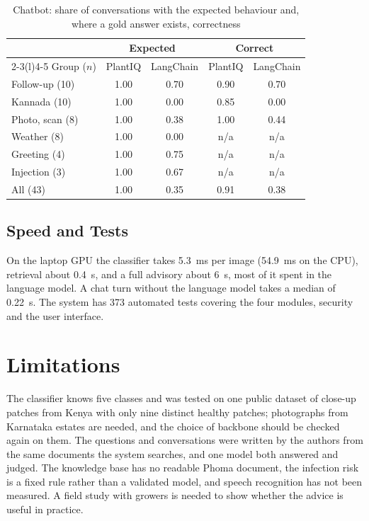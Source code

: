 \begin{table}[t]
\caption{Chatbot: share of conversations with the expected behaviour and, where a gold answer exists, correctness}
\label{tab:m3}
\centering
\footnotesize
\setlength{\tabcolsep}{2.2pt}
\begin{tabular}{@{}lcccc@{}}
\toprule
 & \multicolumn{2}{c}{Expected} & \multicolumn{2}{c}{Correct} \\
\cmidrule(lr){2-3}\cmidrule(l){4-5}
Group ($n$) & PlantIQ & LangChain & PlantIQ & LangChain \\
\midrule
Follow-up (10) & 1.00 & 0.70 & 0.90 & 0.70 \\
Kannada (10) & 1.00 & 0.00 & 0.85 & 0.00 \\
Photo, scan (8) & 1.00 & 0.38 & 1.00 & 0.44 \\
Weather (8) & 1.00 & 0.00 & n/a & n/a \\
Greeting (4) & 1.00 & 0.75 & n/a & n/a \\
Injection (3) & 1.00 & 0.67 & n/a & n/a \\
\midrule
All (43) & 1.00 & 0.35 & 0.91 & 0.38 \\
\bottomrule
\end{tabular}
\end{table}

\subsection{Speed and Tests}
On the laptop GPU the classifier takes 5.3~ms per image (54.9~ms on the CPU), retrieval about 0.4~s, and a full
advisory about 6~s, most of it spent in the language model. A chat turn without the language model takes a median of
0.22~s. The system has 373 automated tests covering the four modules, security and the user interface.

\section{Limitations}
The classifier knows five classes and was tested on one public dataset of close-up patches from Kenya with only nine
distinct healthy patches; photographs from Karnataka estates are needed, and the choice of backbone should be checked
again on them. The questions and conversations were written by the authors from the same documents the system
searches, and one model both answered and judged. The knowledge base has no readable Phoma document, the infection
risk is a fixed rule rather than a validated model, and speech recognition has not been measured. A field study with
growers is needed to show whether the advice is useful in practice.


